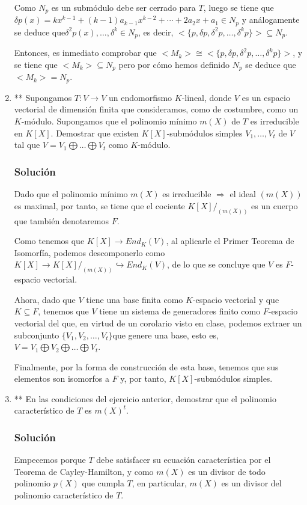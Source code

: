 \documentclass[paper=a4, fontsize=11pt, spanish]{scrartcl}
\begin{document}
\begin{enumerate}
		Como $N_p$ es un submódulo debe ser cerrado para $T$, luego se tiene
		que $\delta p(x) = kx^{k-1} + (k-1)a_{k-1}x^{k-2} + \cdots + 2a_2x+a_1 \in N_p$ y análogamente se deduce
		que$\delta^2 p(x), \dots, \delta^{k} \in N_p$, es decir, $<\{p, \delta p, \delta^2 p, \dots, \delta^k p\}>
		\subseteq N_p$.
		
		Entonces, es inmediato comprobar que $ <M_k> \cong <\{p, \delta p, \delta^2 p, \dots, \delta^k p\}>$, y
		se tiene que $<M_k> \subseteq N_p$ pero por cómo hemos definido $N_p$ se deduce que $<M_k> = N_p$.
		
		\item ** Supongamos $T: V \rightarrow V$ un endomorfismo $K$-lineal, donde $V$ es un espacio vectorial de
		dimensión finita que consideramos, como de costumbre, como un $K$-módulo. Supongamos que el polinomio
		mínimo $m(X)$ de $T$ es irreducible en $K[X]$. Demostrar que existen $K[X]$-submódulos simples $V_1, \dots,
		V_t$ de $V$ tal que $V = V_1 \bigoplus \dots \bigoplus V_t$ como $K$-módulo.
		\subsubsection*{Solución}
		Dado que el polinomio mínimo $m(X)$ es irreducible $\Rightarrow$ el ideal $(m(X))$ es maximal, por tanto,
		se tiene que el cociente $K[X]/_{(m(X))}$ es un cuerpo que también denotaremos $F$.
		
		Como tenemos que $K[X] \rightarrow End_K(V)$, al aplicarle el Primer Teorema de Isomorfía, podemos
		descomponerlo como $K[X] \rightarrow K[X]/_{(m(X))} \hookrightarrow End_K(V)$, de lo que se concluye que
		$V$ es $F$-espacio vectorial.
		
		Ahora, dado que $V$ tiene una base finita como $K$-espacio vectorial y que $K \subseteq F$, tenemos que
		$V$ tiene un sistema de generadores finito como $F$-espacio vectorial del que, en virtud de un corolario
		visto en clase, podemos extraer un subconjunto $\{V_1, V_2, \dots, V_t\}$que genere una base, esto es,
		$V = V_1 \bigoplus V_2 \bigoplus \dots \bigoplus V_t$.
		
		Finalmente, por la forma de construcción de esta base, tenemos que sus elementos son isomorfos a $F$ y,
		por tanto, $K[X]$-submódulos simples.
		
		\item ** En las condiciones del ejercicio anterior, demostrar que el polinomio característico de $T$ es
		$m(X)^t$.
		\subsubsection*{Solución}
		Empecemos porque $T$ debe satisfacer su ecuación característica por el Teorema de Cayley-Hamilton, y
		como $m(X)$ es un divisor de todo polinomio $p(X)$ que cumpla $T$, en particular, $m(X)$ es un divisor
		del polinomio característico de $T$.
		

\end{enumerate}
\end{document}
